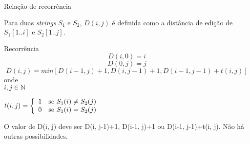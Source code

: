 \begin{frame}{Relação de recorrência}
  \begin{definition}
    Para duas {\it strings\/} $S_1$ e $S_2$, $D(i, j)$ é definida como
    a distância de edição de $S_1[1..i]$ e $S_2[1..j]$.
  \end{definition}

\begin{block}{Recorrência}
\[
D(i, 0) = i
\]
\[
D(0,j) = j
\]
\[
D(i, j) = min[D(i-1, j)+1, D(i, j-1)+1, D(i-1, j-1) + t(i, j)]
\]
onde\\
\(
i, j \in \mathbb{N}
\)

 \(
 t(i,j) = \left\{
 \begin{array}[]{ll}
   1 & \text{se}\  S_1(i) \neq S_2(j) \\
   0 & \text{se}\  S_1(i) = S_2(j) \\
 \end{array}
\right.
 \)
\end{block}

\begin{lemma}
   O valor de D(i, j) deve ser D(i, j-1)+1, D(i-1, j)+1 ou D(i-1,
   j-1)+t(i, j). Não há outras possibilidades.
 \end{lemma}
\end{frame}


